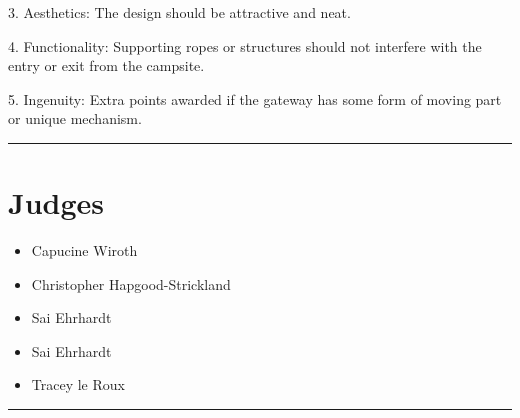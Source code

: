 \documentclass[10pt]{article}
\begin{document}
3. Aesthetics: The design should be attractive and neat.

4. Functionality: Supporting ropes or structures should not interfere with the entry or exit from the campsite.

5. Ingenuity: Extra points awarded if the gateway has some form of moving part or unique mechanism.


\vspace{0.5cm}
	\hrule
	\vspace{0.5cm}
		\section*{\faUsers \: Judges}

		

	\begin{multicols}{2}

		\begin{itemize}
									\item Capucine Wiroth
									\item Christopher Hapgood-Strickland
									\item Sai Ehrhardt
						\end{itemize}

		\vfill\null
		\columnbreak

		\begin{itemize}
									\item Sai Ehrhardt
									\item Tracey le Roux
						\end{itemize}

		\vfill\null

		\end{multicols}



			\vspace{0.5cm}
	\hrule
	\vspace{0.5cm}
\end{document}
